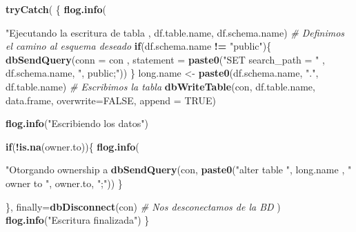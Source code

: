 \documentclass[]{article}
\newenvironment{Shaded}{\begin{snugshade}}{\end{snugshade}}
\newcommand{\KeywordTok}[1]{\textcolor[rgb]{0.13,0.29,0.53}{\textbf{#1}}}
\newcommand{\DataTypeTok}[1]{\textcolor[rgb]{0.13,0.29,0.53}{#1}}
\newcommand{\StringTok}[1]{\textcolor[rgb]{0.31,0.60,0.02}{#1}}
\newcommand{\CommentTok}[1]{\textcolor[rgb]{0.56,0.35,0.01}{\textit{#1}}}
\newcommand{\OtherTok}[1]{\textcolor[rgb]{0.56,0.35,0.01}{#1}}
\newcommand{\ControlFlowTok}[1]{\textcolor[rgb]{0.13,0.29,0.53}{\textbf{#1}}}
\newcommand{\OperatorTok}[1]{\textcolor[rgb]{0.81,0.36,0.00}{\textbf{#1}}}
\newcommand{\NormalTok}[1]{#1}
\begin{document}
\begin{Shaded}
\begin{Highlighting}[]
{  \KeywordTok{tryCatch}\NormalTok{( \{}
    \KeywordTok{flog.info}\NormalTok{(}\StringTok{"Ejecutando la escritura de tabla %
\NormalTok{              , df.table.name, df.schema.name)}
    \CommentTok{# Definimos el camino al esquema deseado}
    \ControlFlowTok{if}\NormalTok{(df.schema.name }\OperatorTok{!=}\StringTok{ "public"}\NormalTok{)\{}
      \KeywordTok{dbSendQuery}\NormalTok{(}\DataTypeTok{conn =}\NormalTok{ con}
\NormalTok{                  , }\DataTypeTok{statement =} \KeywordTok{paste0}\NormalTok{(}\StringTok{"SET search_path = "}
\NormalTok{                                       , df.schema.name, }\StringTok{", public;"}\NormalTok{))}
\NormalTok{    \}}
\NormalTok{    long.name <-}\StringTok{ }\KeywordTok{paste0}\NormalTok{(df.schema.name, }\StringTok{"."}\NormalTok{, df.table.name)}
    \CommentTok{# Escribimos la tabla}
    \KeywordTok{dbWriteTable}\NormalTok{(con,}
\NormalTok{                 df.table.name,}
\NormalTok{                 data.frame,}
                 \DataTypeTok{overwrite=}\OtherTok{FALSE}\NormalTok{,}
                 \DataTypeTok{append =} \OtherTok{TRUE}\NormalTok{)}
    
    \KeywordTok{flog.info}\NormalTok{(}\StringTok{"Escribiendo los datos"}\NormalTok{)}
    
    \ControlFlowTok{if}\NormalTok{(}\OperatorTok{!}\KeywordTok{is.na}\NormalTok{(owner.to))\{}
      \KeywordTok{flog.info}\NormalTok{(}\StringTok{"Otorgando ownership a %
      \KeywordTok{dbSendQuery}\NormalTok{(con, }\KeywordTok{paste0}\NormalTok{(}\StringTok{"alter table "}\NormalTok{, long.name}
\NormalTok{                              , }\StringTok{" owner to "}\NormalTok{, owner.to, }\StringTok{";"}\NormalTok{))}
\NormalTok{    \}}
    
\NormalTok{  \}, }\DataTypeTok{finally=}\KeywordTok{dbDisconnect}\NormalTok{(con) }\CommentTok{# Nos desconectamos de la BD}
\NormalTok{  )}
  \KeywordTok{flog.info}\NormalTok{(}\StringTok{"Escritura finalizada"}\NormalTok{)}
\NormalTok{\}}

}}}
\end{Highlighting}
\end{Shaded}
\end{document}
